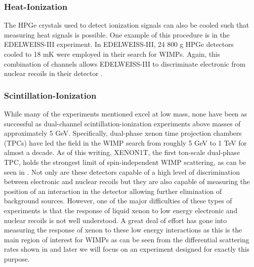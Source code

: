 \subsubsection{Heat-Ionization}

The HPGe crystals used to detect ionization signals can also be cooled such that measuring heat signals is possible.  One example of this procedure is in the EDELWEISS-III experiment.  In EDELWEISS-III, 24 800 g HPGe detectors cooled to 18 mK were employed in their search for WIMPs. Again, this combination of channels allows EDELWEISS-III to discriminate electronic from nuclear recoils in their detector \cite{armengaud2016constraints}.

\subsubsection{Scintillation-Ionization}

While many of the experiments mentioned excel at low mass, none have been as successful as dual-channel scintillation-ionization experiments above masses of approximately 5 GeV.  Specifically, dual-phase xenon time projection chambers (TPCs) have led the field in the WIMP search from roughly 5 GeV to 1 TeV for almost a decade.  As of this writing, XENON1T, the first ton-scale dual-phase TPC, holds the strongest limit of spin-independent WIMP scattering, as can be seen in  \cite{aprile2017first, collaboration2017dark}.  Not only are these detectors capable of a high level of discrimination between electronic and nuclear recoils but they are also capable of measuring the position of an interaction in the detector allowing further elimination of background sources.  However, one of the major difficulties of these types of experiments is that the response of liquid xenon to low energy electronic and nuclear recoils is not well understood.  A great deal of effort has gone into measuring the response of xenon to these low energy interactions as this is the main region of interest for WIMPs as can be seen from the differential scattering rates shown in  and later we will focus on an experiment designed for exactly this purpose.


